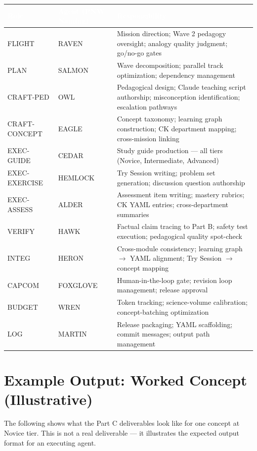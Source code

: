 \documentclass[11pt,letterpaper]{article}
\newcommand{\tableheader}[1]{\textbf{\sffamily\textcolor{white}{#1}}}
\begin{document}
\begin{center}
\begin{tabularx}{\textwidth}{L{2cm}L{3cm}X}
\toprule
{}
\tableheader{Role} & \tableheader{Agent (PNW Naming)} & \tableheader{Responsibility} \\
\midrule
FLIGHT & RAVEN & Mission direction; Wave 2 pedagogy oversight; analogy quality judgment; go/no-go gates \\
PLAN & SALMON & Wave decomposition; parallel track optimization; dependency management \\
CRAFT-PED & OWL & Pedagogical design; Claude teaching script authorship; misconception identification; escalation pathways \\
CRAFT-CONCEPT & EAGLE & Concept taxonomy; learning graph construction; CK department mapping; cross-mission linking \\
EXEC-GUIDE & CEDAR & Study guide production — all tiers (Novice, Intermediate, Advanced) \\
EXEC-EXERCISE & HEMLOCK & Try Session writing; problem set generation; discussion question authorship \\
EXEC-ASSESS & ALDER & Assessment item writing; mastery rubrics; CK YAML entries; cross-department summaries \\
VERIFY & HAWK & Factual claim tracing to Part B; safety test execution; pedagogical quality spot-check \\
INTEG & HERON & Cross-module consistency; learning graph $\to$ YAML alignment; Try Session $\to$ concept mapping \\
CAPCOM & FOXGLOVE & Human-in-the-loop gate; revision loop management; release approval \\
BUDGET & WREN & Token tracking; science-volume calibration; concept-batching optimization \\
LOG & MARTIN & Release packaging; YAML scaffolding; commit messages; output path management \\
\bottomrule
\end{tabularx}
\end{center}

\section{Example Output: Worked Concept (Illustrative)}

The following shows what the Part C deliverables look like for one concept at Novice tier. This is not a real deliverable --- it illustrates the expected output format for an executing agent.
\end{document}
